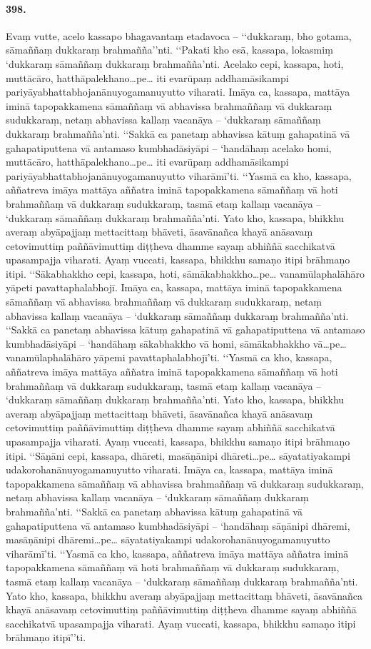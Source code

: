\paragraph{398.} Evaṃ vutte, acelo kassapo bhagavantaṃ etadavoca – ‘‘dukkaraṃ, bho gotama, sāmaññaṃ dukkaraṃ brahmañña’’nti. ‘‘Pakati kho esā, kassapa, lokasmiṃ ‘dukkaraṃ sāmaññaṃ dukkaraṃ brahmañña’nti. Acelako cepi, kassapa, hoti, muttācāro, hatthāpalekhano…pe… iti evarūpaṃ addhamāsikampi pariyāyabhattabhojanānuyogamanuyutto viharati. Imāya ca, kassapa, mattāya iminā tapopakkamena sāmaññaṃ vā abhavissa brahmaññaṃ vā dukkaraṃ sudukkaraṃ, netaṃ abhavissa kallaṃ vacanāya – ‘dukkaraṃ sāmaññaṃ dukkaraṃ brahmañña’nti. ‘‘Sakkā ca panetaṃ abhavissa kātuṃ gahapatinā vā gahapatiputtena vā antamaso kumbhadāsiyāpi – ‘handāhaṃ acelako homi, muttācāro, hatthāpalekhano…pe… iti evarūpaṃ addhamāsikampi pariyāyabhattabhojanānuyogamanuyutto viharāmī’ti. ‘‘Yasmā ca kho, kassapa, aññatreva imāya mattāya aññatra iminā tapopakkamena sāmaññaṃ vā hoti brahmaññaṃ vā dukkaraṃ sudukkaraṃ, tasmā etaṃ kallaṃ vacanāya – ‘dukkaraṃ sāmaññaṃ dukkaraṃ brahmañña’nti. Yato kho, kassapa, bhikkhu averaṃ abyāpajjaṃ mettacittaṃ bhāveti, āsavānañca khayā anāsavaṃ cetovimuttiṃ paññāvimuttiṃ diṭṭheva dhamme sayaṃ abhiññā sacchikatvā upasampajja viharati. Ayaṃ vuccati, kassapa, bhikkhu samaṇo itipi brāhmaṇo itipi. ‘‘Sākabhakkho cepi, kassapa, hoti, sāmākabhakkho…pe… vanamūlaphalāhāro yāpeti pavattaphalabhojī. Imāya ca, kassapa, mattāya iminā tapopakkamena sāmaññaṃ vā abhavissa brahmaññaṃ vā dukkaraṃ sudukkaraṃ, netaṃ abhavissa kallaṃ vacanāya – ‘dukkaraṃ sāmaññaṃ dukkaraṃ brahmañña’nti. ‘‘Sakkā ca panetaṃ abhavissa kātuṃ gahapatinā vā gahapatiputtena vā antamaso kumbhadāsiyāpi – ‘handāhaṃ sākabhakkho vā homi, sāmākabhakkho vā…pe… vanamūlaphalāhāro yāpemi pavattaphalabhojī’ti. ‘‘Yasmā ca kho, kassapa, aññatreva imāya mattāya aññatra iminā tapopakkamena sāmaññaṃ vā hoti brahmaññaṃ vā dukkaraṃ sudukkaraṃ, tasmā etaṃ kallaṃ vacanāya – ‘dukkaraṃ sāmaññaṃ dukkaraṃ brahmañña’nti. Yato kho, kassapa, bhikkhu averaṃ abyāpajjaṃ mettacittaṃ bhāveti, āsavānañca khayā anāsavaṃ cetovimuttiṃ paññāvimuttiṃ diṭṭheva dhamme sayaṃ abhiññā sacchikatvā upasampajja viharati. Ayaṃ vuccati, kassapa, bhikkhu samaṇo itipi brāhmaṇo itipi. ‘‘Sāṇāni cepi, kassapa, dhāreti, masāṇānipi dhāreti…pe… sāyatatiyakampi udakorohanānuyogamanuyutto viharati. Imāya ca, kassapa, mattāya iminā tapopakkamena sāmaññaṃ vā abhavissa brahmaññaṃ vā dukkaraṃ sudukkaraṃ, netaṃ abhavissa kallaṃ vacanāya – ‘dukkaraṃ sāmaññaṃ dukkaraṃ brahmañña’nti. ‘‘Sakkā ca panetaṃ abhavissa kātuṃ gahapatinā vā gahapatiputtena vā antamaso kumbhadāsiyāpi – ‘handāhaṃ sāṇānipi dhāremi, masāṇānipi dhāremi…pe… sāyatatiyakampi udakorohanānuyogamanuyutto viharāmī’ti. ‘‘Yasmā ca kho, kassapa, aññatreva imāya mattāya aññatra iminā tapopakkamena sāmaññaṃ vā hoti brahmaññaṃ vā dukkaraṃ sudukkaraṃ, tasmā etaṃ kallaṃ vacanāya – ‘dukkaraṃ sāmaññaṃ dukkaraṃ brahmañña’nti. Yato kho, kassapa, bhikkhu averaṃ abyāpajjaṃ mettacittaṃ bhāveti, āsavānañca khayā anāsavaṃ cetovimuttiṃ paññāvimuttiṃ diṭṭheva dhamme sayaṃ abhiññā sacchikatvā upasampajja viharati. Ayaṃ vuccati, kassapa, bhikkhu samaṇo itipi brāhmaṇo itipī’’ti.


